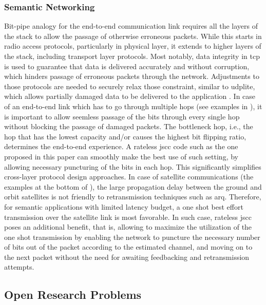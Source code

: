 \subsubsection{Semantic Networking} 
Bit-pipe analogy for  the end-to-end  communication link requires all the layers of the stack to allow the passage of otherwise erroneous packets. While this starts in radio access protocols, particularly in physical layer, it extends to higher layers of the stack, including transport layer protocols. Most notably,  data integrity in \gls{tcp} is used to  guarantee that data is delivered accurately and without corruption, which hinders passage of erroneous packets through the network. Adjustments to those protocols are needed to securely relax those constraint, similar to \gls{udplite}, which allows partially damaged data to be delivered to the application \cite{larzon1999lighter}.
In case of an end-to-end link which has to go through multiple  hops  (see examples in ), it is important to allow seemless passage of the bits through every single hop without blocking the passage of damaged packets. The bottleneck hop, i.e., the hop that has the lowest capacity and/or causes the highest bit flipping ratio, determines the end-to-end experience. A rateless \gls{jscc} code such as the one proposed in this paper can smoothly make the best use  of such setting, by allowing  necessary puncturing of the bits in each hop. This significantly simplifies cross-layer protocol design approaches.
In case of satellite communications (the examples at the bottom of ), the large propagation delay between the ground and orbit satellites is not friendly to retransmission techniques such as \gls{arq}. Therefore, for semantic applications with limited latency budget, a one shot best effort transmission over the satellite link is most favorable.  In such case, rateless \gls{jscc} poses an additional benefit, that is, allowing to maximize the utilization of the one shot transmission by enabling the network to puncture the necessary number of bits out of the packet according to the estimated channel, and moving on to the next packet without the need for awaiting feedbacking and retransmission attempts.







\subsection{Open Research Problems}
\label{sec:openresearch}



